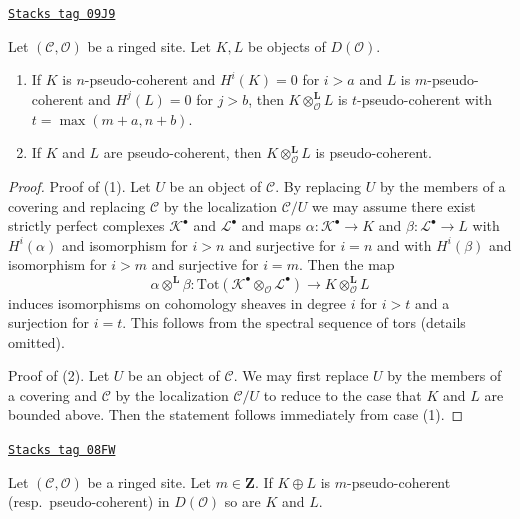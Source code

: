 \begin{lemma}
\label{sites-cohomology-lemma-tensor-pseudo-coherent}
\href{https://stacks.math.columbia.edu/tag/09J9}{\texttt{Stacks tag 09J9}}

Let $(\mathcal{C}, \mathcal{O})$ be a ringed site. Let $K, L$ be objects
of $D(\mathcal{O})$.
\begin{enumerate}
\item If $K$ is $n$-pseudo-coherent and $H^i(K) = 0$ for $i > a$
and $L$ is $m$-pseudo-coherent and $H^j(L) = 0$ for $j > b$, then
$K \otimes_\mathcal{O}^\mathbf{L} L$ is $t$-pseudo-coherent
with $t = \max(m + a, n + b)$.
\item If $K$ and $L$ are pseudo-coherent, then
$K \otimes_\mathcal{O}^\mathbf{L} L$ is pseudo-coherent.
\end{enumerate}
\end{lemma}

\begin{proof}
Proof of (1). Let $U$ be an object of $\mathcal{C}$.
By replacing $U$ by the members of a covering
and replacing $\mathcal{C}$ by the localization $\mathcal{C}/U$
we may assume there exist strictly perfect complexes $\mathcal{K}^\bullet$
and $\mathcal{L}^\bullet$ and maps
$\alpha : \mathcal{K}^\bullet \to K$ and
$\beta : \mathcal{L}^\bullet \to L$ with $H^i(\alpha)$ and isomorphism
for $i > n$ and surjective for $i = n$ and with
$H^i(\beta)$ and isomorphism for $i > m$ and surjective for $i = m$.
Then the map
$$
\alpha \otimes^\mathbf{L} \beta :
\text{Tot}(\mathcal{K}^\bullet \otimes_\mathcal{O} \mathcal{L}^\bullet)
\to K \otimes_\mathcal{O}^\mathbf{L} L
$$
induces isomorphisms on cohomology sheaves in degree $i$ for
$i > t$ and a surjection for $i = t$. This follows from the
spectral sequence of tors (details omitted).

\medskip\noindent
Proof of (2). Let $U$ be an object of $\mathcal{C}$.
We may first replace $U$ by the members of a covering
and $\mathcal{C}$ by the localization $\mathcal{C}/U$
to reduce to the case that $K$ and $L$ are bounded above.
Then the statement follows immediately from case (1).
\end{proof}

\begin{lemma}
\label{sites-cohomology-lemma-summands-pseudo-coherent}
\href{https://stacks.math.columbia.edu/tag/08FW}{\texttt{Stacks tag 08FW}}

Let $(\mathcal{C}, \mathcal{O})$ be a ringed site. Let $m \in \mathbf{Z}$.
If $K \oplus L$ is $m$-pseudo-coherent (resp.\ pseudo-coherent)
in $D(\mathcal{O})$ so are $K$ and $L$.
\end{lemma}

